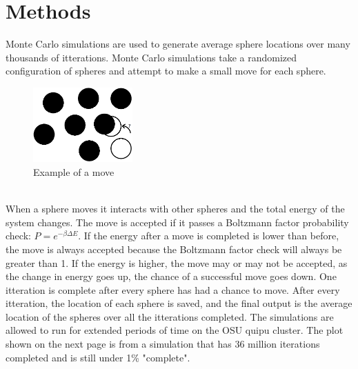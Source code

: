 \documentclass[a4paper,12pt]{article}
\begin{document}
\section*{Methods}

Monte Carlo simulations are used to generate average sphere locations over many thousands of itterations.    Monte Carlo simulations take a randomized configuration of spheres and attempt to make a small move for each sphere. 
\begin{figure}[h]
\centering
\includegraphics[width=1.5in]{Sample_Move.PNG}
\caption{Example of a move}
\end{figure}\\
 When a sphere moves it interacts with other spheres and the total energy of the system changes.  The move is accepted if it passes a Boltzmann factor probability check:  $P=e^{-\beta\Delta E}$.  If the energy after a move is completed is lower than before, the move is always accepted because the Boltzmann factor check will always be greater than 1.  If the energy is higher, the move may or may not be accepted, as the change in energy goes up, the chance of a successful move goes down.  One itteration is complete after every sphere has had a chance to move.  After every itteration, the location of each sphere is saved, and the final output is the average location of the spheres over all the itterations completed.  The simulations are allowed to run for extended periods of time on the OSU quipu cluster.  The plot shown on the next page is from a simulation that has 36 million iterations completed and is still under 1\% "complete".
\end{document}
